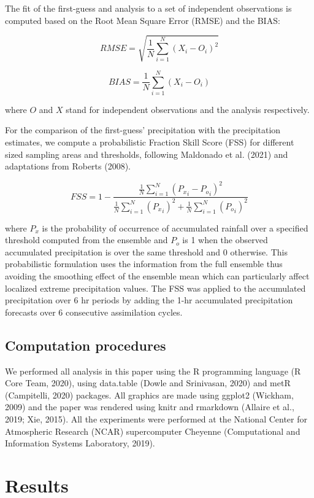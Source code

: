 \documentclass[final,5p,times,twocolumn,authoryear]{elsarticle} %
\begin{document}
The fit of the first-guess and analysis to a set of independent observations is computed based on the Root Mean Square Error (RMSE) and the BIAS:

\[\mathit{RMSE} = \sqrt{\frac{1}{N}\sum_{i = 1}^{N} (X_i - O_i)^{2}}\]

\[\mathit{BIAS} = \frac{1}{N}\sum_{i = 1}^{N} (X_i - O_i)\]

where \(O\) and \(X\) stand for independent observations and the analysis respectively.

For the comparison of the first-guess' precipitation with the precipitation estimates, we compute a probabilistic Fraction Skill Score (FSS) for different sized sampling areas and thresholds, following Maldonado et al. (2021) and adaptations from Roberts (2008).

\[\mathit{FSS} = 1-\frac{\frac{1}{N}\sum_{i=1}^{N} ({P_x}_i-{P_o}_i)^{2}}{\frac{1}{N}\sum_{i=1}^{N} ({P_x}_i)^{2}+\frac{1}{N}\sum_{i=1}^{N} ({P_o}_i)^{2}} \]

where \({P_x}\) is the probability of occurrence of accumulated rainfall over a specified threshold computed from the ensemble and \({P_o}\) is 1 when the observed accumulated precipitation is over the same threshold and 0 otherwise. This probabilistic formulation uses the information from the full ensemble thus avoiding the smoothing effect of the ensemble mean which can particularly affect localized extreme precipitation values. The FSS was applied to the accumulated precipitation over 6 hr periods by adding the 1-hr accumulated precipitation forecasts over 6 consecutive assimilation cycles.

\hypertarget{computation-procedures}{%
\subsection{Computation procedures}\label{computation-procedures}}

We performed all analysis in this paper using the R programming language (R Core Team, 2020), using data.table (Dowle and Srinivasan, 2020) and metR (Campitelli, 2020) packages.
All graphics are made using ggplot2 (Wickham, 2009) and the paper was rendered using knitr and rmarkdown (Allaire et al., 2019; Xie, 2015). All the experiments were performed at the National Center for Atmospheric Research (NCAR) supercomputer Cheyenne (Computational and Information Systems Laboratory, 2019).

\hypertarget{results}{%
\section{Results}\label{results}}
\end{document}
